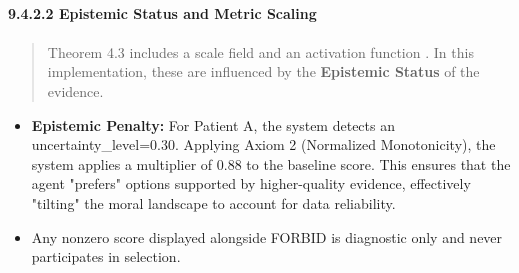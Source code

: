 \documentclass[12pt]{article}
\theoremstyle{plain}
\theoremstyle{definition}
\theoremstyle{remark}
\begin{document}
\paragraph{9.4.2.2 Epistemic Status and Metric
Scaling}\label{epistemic-status-and-metric-scaling}

\paragraph{}\label{section}

\begin{quote}
Theorem 4.3 includes a scale field and an activation function . In this
implementation, these are influenced by the \textbf{Epistemic Status} of
the evidence.
\end{quote}

\begin{itemize}
\item
  \textbf{Epistemic Penalty:} For Patient A, the system detects an
  uncertainty\_level=0.30. Applying Axiom 2 (Normalized Monotonicity),
  the system applies a multiplier of 0.88 to the baseline score. This
  ensures that the agent "prefers" options supported by higher-quality
  evidence, effectively "tilting" the moral landscape to account for
  data reliability.
\item
  Any nonzero score displayed alongside FORBID is diagnostic only and
  never participates in selection.
\end{itemize}
\end{document}
